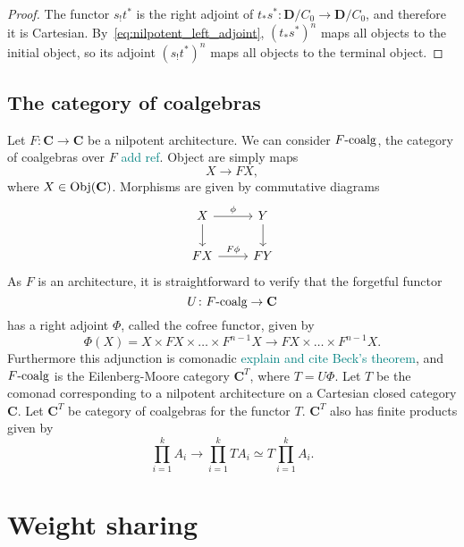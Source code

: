 \documentclass[12pt]{article}
\newcommand{\pietro}[1]{\textcolor{teal}{#1}}
\newcommand{\Obj}{{\textnormal{Obj}}}
\newcommand{\Cat}{{\mathbf{C}}}
\newcommand{\DCat}{{\mathbf{D}}}
\newcommand{\coalg}{{F\textnormal{-coalg}}}
\begin{document}
\begin{proof}
    The functor $s_!t^*$ is the right adjoint of  $t_*s^*\colon \DCat/C_0 \rightarrow \DCat/C_0$, and therefore it is Cartesian. By~\cref{eq:nilpotent_left_adjoint}, $(t_*s^*)^n$ maps all objects to the initial object, so its adjoint $(s_!t^*)^n$ maps all objects to the terminal object.
\end{proof}

\subsection{The category of coalgebras}

Let $F\colon \Cat \rightarrow \Cat$ be a nilpotent architecture. We can consider $\coalg$, the category of coalgebras over $F$ \pietro{add ref}. Object are simply maps
\begin{equation*}
    X \rightarrow F X,
\end{equation*}
where $X \in \Obj(\Cat)$. Morphisms are given by commutative diagrams
\begin{equation*}
    \begin{tikzcd}
        X \arrow[rightarrow]{d} \arrow[rightarrow]{r}{\phi}
        & Y \arrow[rightarrow]{d} \\
        FX \arrow[rightarrow]{r}{F \phi}
        & FY
    \end{tikzcd}
\end{equation*}
As $F$ is an architecture, it is straightforward to verify that the forgetful functor
\begin{equation*}
    U \colon \coalg \rightarrow \Cat
\end{equation*}
has a right adjoint $\Phi$, called the cofree functor, given by
\begin{equation*}
    \Phi(X) = X \times F X \times \dots \times F^{n-1} X \rightarrow F X \times \dots \times F^{n-1} X.
\end{equation*}
Furthermore this adjunction is comonadic \pietro{explain and cite Beck's theorem}, and $\coalg$ is the Eilenberg-Moore category $\Cat^T$, where $T = U\Phi$. Let $T$ be the comonad corresponding to a nilpotent architecture on a Cartesian closed category $\Cat$. Let $\Cat^T$ be category of coalgebras for the functor $T$. $\Cat^T$ also has finite products given by
\begin{equation*}
    \prod_{i=1}^k A_i \rightarrow \prod_{i=1}^k T A_i \simeq T \prod_{i=1}^k A_i.
\end{equation*}

\section{Weight sharing}
\end{document}
